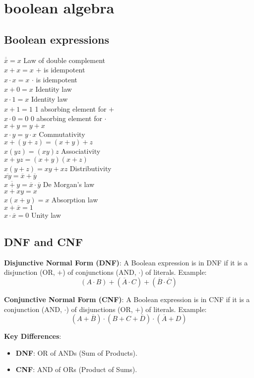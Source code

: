\section{boolean algebra}
\subsection*{Boolean expressions}
$\overline{\overline{x}} = x$ Law of double complement \\
$x + x = x$ $+$ is idempotent \\
$x \cdot x = x$  $\cdot$ is idempotent \\
$x + 0 = x$ Identity law \\ 
$x \cdot 1 = x$ Identity law \\
$x + 1 = 1$ 1 absorbing element for $+$ \\
$x \cdot 0 = 0$  0 absorbing element for $\cdot$ \\
$x + y = y + x$ \\
$x \cdot y = y \cdot x$ Commutativity \\
$x + (y + z) = (x + y) + z$ \\
 $x (y z) = (x y) z$ Associativity \\
$x + y z = (x + y)(x + z)$ \\
 $x (y + z) = x y + x z$ Distributivity \\
$\overline{x y} = \overline{x} + \overline{y}$ \\
 $\overline{x + y} = \overline{x} \cdot \overline{y}$ De Morgan's law \\
$x + x y = x$ \\
 $x (x + y) = x$ Absorption law \\
$x + \overline{x} = 1$ \\ $x \cdot \overline{x} = 0$ Unity law \\

\subsection*{DNF and CNF}

\textbf{Disjunctive Normal Form (DNF)}: A Boolean expression is in DNF if it is a disjunction (OR, \(+\)) of conjunctions (AND, \(\cdot\)) of literals. Example:
\[
(A \cdot B) + (\overline{A} \cdot C) + (\overline{B} \cdot \overline{C})
\]


\textbf{Conjunctive Normal Form (CNF)}: A Boolean expression is in CNF if it is a conjunction (AND, \(\cdot\)) of disjunctions (OR, \(+\)) of literals. Example:
\[
(A + \overline{B}) \cdot (B + C + \overline{D}) \cdot (\overline{A} + D)
\]


\textbf{Key Differences}:
\begin{itemize}
    \item \textbf{DNF}: OR of ANDs (Sum of Products).
    \item \textbf{CNF}: AND of ORs (Product of Sums).
\end{itemize}

